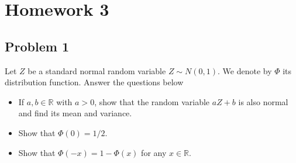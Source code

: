 \chapter{Homework 3}\label{homework-3}

\section{Problem 1}\label{hw03-problem-1}

Let \(\mathit{Z}\) be a standard normal random variable \(\mathit{Z} \sim \mathit{N}(0,1)\). We denote by \(\Phi\) its distribution function. Answer the questions below

\begin{itemize}
\item
  If \(\mathit{a},\mathit{b} \in \mathbb{R}\) with \(\mathit{a} > 0\), show that the random variable \(\mathit{a}\mathit{Z} + \mathit{b}\) is also normal and find its mean and variance.
\item
  Show that \(\Phi(0) = 1/2\).
\item
  Show that \(\Phi( - \mathit{x}) = 1 - \Phi(\mathit{x})\) for any \(\mathit{x} \in \mathbb{R}\).
\end{itemize}

